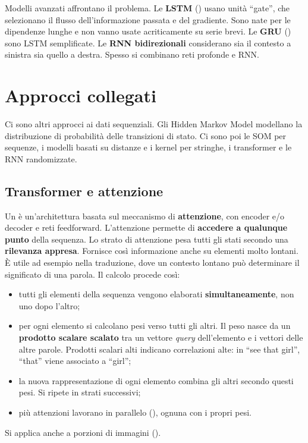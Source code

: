 Modelli avanzati affrontano il problema. Le \textbf{LSTM} () usano unità ``gate'', che
selezionano il flusso dell'informazione passata e del gradiente. Sono nate per le dipendenze lunghe e non vanno usate
acriticamente su serie brevi. Le \textbf{GRU} () sono LSTM semplificate. Le \textbf{RNN
bidirezionali} considerano sia il contesto a sinistra sia quello a destra. Spesso si combinano reti profonde e RNN.

\section{Approcci collegati}

Ci sono altri approcci ai dati sequenziali. Gli Hidden Markov Model modellano la distribuzione di probabilità delle
transizioni di stato. Ci sono poi le SOM per sequenze, i modelli basati su distanze e i kernel per stringhe, i
transformer e le RNN randomizzate.

\subsection{Transformer e attenzione}
\label{sec:transformer}

Un  è un'architettura basata sul meccanismo di \textbf{attenzione}, con encoder e/o decoder e
reti feedforward. L'attenzione permette di \textbf{accedere a qualunque punto} della sequenza. Lo strato di
attenzione pesa tutti gli stati secondo una \textbf{rilevanza appresa}. Fornisce così informazione anche su
elementi molto lontani. È utile ad esempio nella traduzione, dove un contesto lontano può determinare il significato
di una parola. Il calcolo procede così:
\begin{itemize}
  \item tutti gli elementi della sequenza vengono elaborati \textbf{simultaneamente}, non uno dopo l'altro;
  \item per ogni elemento si calcolano pesi verso tutti gli altri. Il peso nasce da un \textbf{prodotto scalare
        scalato} tra un vettore \emph{query} dell'elemento e i vettori delle altre parole. Prodotti scalari alti
        indicano correlazioni alte: in ``see that girl'', ``that'' viene associato a ``girl'';
  \item la nuova rappresentazione di ogni elemento combina gli altri secondo questi pesi. Si ripete in strati
        successivi;
  \item più attenzioni lavorano in parallelo (), ognuna con i propri pesi.
\end{itemize}
Si applica anche a porzioni di immagini ().

